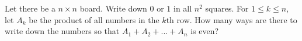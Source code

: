 Let there be a $n\times n$ board. Write down $0$ or $1$ in all $n^2$ squares. For $1 \le k \le n$, let $A_k$ be the product of all numbers in the $k$th row. How many ways are there to write down the numbers so that $A_1 + A_2 + ... + A_n$ is even?